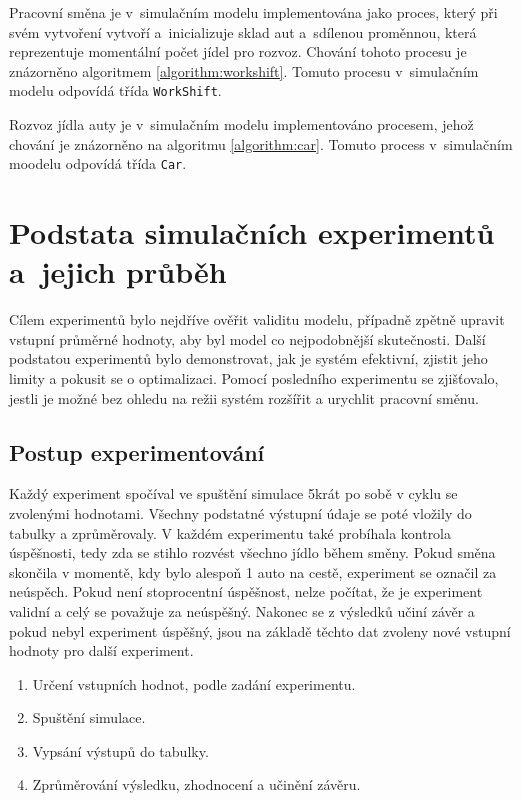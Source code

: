 \documentclass[a4paper, 11pt]{article}
\begin{document}
	Pracovní směna je v~simulačním modelu implementována jako proces, který
	při svém vytvoření vytvoří a~inicializuje sklad
	\cite[snímek 184]{IMS_slides} aut a~sdílenou proměnnou, která reprezentuje
	momentální počet jídel pro rozvoz. Chování tohoto procesu
	je znázorněno algoritmem \ref{algorithm:workshift}. Tomuto procesu
	v~simulačním modelu odpovídá třída \texttt{WorkShift}.

	Rozvoz jídla auty je v~simulačním modelu implementováno procesem, jehož
	chování je znázorněno na algoritmu \ref{algorithm:car}. Tomuto process
	v~simulačním moodelu odpovídá třída \texttt{Car}.



	\section{Podstata simulačních experimentů a~jejich průběh}

	Cílem experimentů bylo nejdříve ověřit validitu modelu, případně zpětně
	upravit vstupní průměrné hodnoty, aby byl model co nejpodobnější skutečnosti.
	Další podstatou experimentů bylo demonstrovat, jak je systém efektivní,
	zjistit jeho limity a pokusit se o optimalizaci. Pomocí posledního
	experimentu se zjišťovalo, jestli je možné bez ohledu na režii systém
	rozšířit a urychlit pracovní směnu.


	\subsection{Postup experimentování}

	Každý experiment spočíval ve spuštění simulace 5krát po sobě v cyklu se
	zvolenými hodnotami. Všechny podstatné výstupní údaje se poté vložily do
	tabulky a zprůměrovaly. V každém experimentu také probíhala kontrola
	úspěšnosti, tedy zda se stihlo rozvést všechno jídlo během směny. Pokud
	směna skončila v momentě, kdy bylo alespoň 1 auto na cestě, experiment se
	označil za neúspěch. Pokud není stoprocentní úspěšnost, nelze počítat,
	že je experiment validní a celý se považuje za neúspěšný. Nakonec se z
	výsledků učiní závěr a pokud nebyl experiment úspěšný, jsou na základě
	těchto dat zvoleny nové vstupní hodnoty pro další experiment.

	\begin{enumerate}
		\item Určení vstupních hodnot, podle zadání experimentu.

		\item Spuštění simulace.

		\item Vypsání výstupů do tabulky.

		\item Zprůměrování výsledku, zhodnocení a učinění závěru.

	\end{enumerate}
\end{document}
